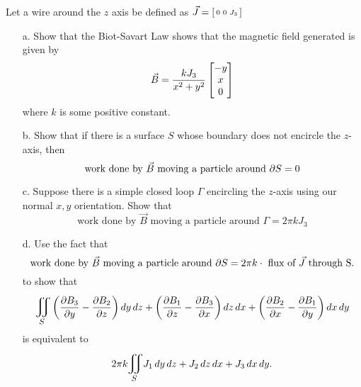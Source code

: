 \documentclass[titlepage]{article}
\begin{document}
\begin{problem}{2}
Let a wire around the $z$ axis be defined as $\vec{J} = \left[\begin{smallmatrix}0 & 0 & J_3\end{smallmatrix}\right]$
\begin{itemize}
\item[a.] Show that the Biot-Savart Law shows that the magnetic field generated is given by 
$$ \vec{B} = \frac{kJ_3}{x^2 + y^2}\bmat{-y \\ x \\ 0} $$
where $k$ is some positive constant.
\item[b.] Show that if there is a surface $S$ whose boundary does not encircle the $z$-axis, then
$$ \text{work done by } \vec{B} \text{ moving a particle around } \partial S = 0$$
\item[c.] Suppose there is a simple closed loop $\Gamma$ encircling the $z$-axis using our normal $x, y$ orientation. Show that
$$ \text{work done by }\vec{B} \text{ moving a particle around } \Gamma = 2\pi kJ_3$$
\item[d.] Use the fact that 
$$\text{work done by }\vec{B} \text{ moving a particle around } \partial S = 2\pi k \cdot \text{ flux of } \vec{J} \text{ through S.}$$
to show that
$$\bigiint{S}{} \left(\frac{\p B_3}{\p y} - \frac{\p B_2}{\p z}\right)dy\,dz + \left(\frac{\p B_1}{\p z} - \frac{\p B_3}{\p x}\right)dz\,dx + \left(\frac{\p B_2}{\p x} - \frac{\p B_1}{\p y}\right)dx\,dy $$
is equivalent to
$$2\pi k \bigiint{S}{} J_1\,dy\,dz + J_2\,dz\,dx + J_3\,dx\,dy.$$
\end{itemize}
\end{problem}
\end{document}
